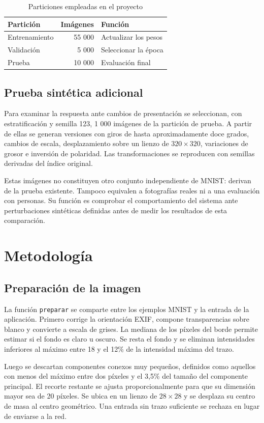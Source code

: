 \documentclass[conference]{IEEEtran}
\begin{document}
\begin{table}[t]
\caption{Particiones empleadas en el proyecto}
\label{tab:particiones}
\centering
\begin{tabular}{lrl}
\hline
Partición & Imágenes & Función \\
\hline
Entrenamiento & 55 000 & Actualizar los pesos \\
Validación & 5 000 & Seleccionar la época \\
Prueba & 10 000 & Evaluación final \\
\hline
\end{tabular}
\end{table}

\subsection{Prueba sintética adicional}
Para examinar la respuesta ante cambios de presentación se seleccionan, con estratificación y semilla 123, 1 000 imágenes de la partición de prueba. A partir de ellas se generan versiones con giros de hasta aproximadamente doce grados, cambios de escala, desplazamiento sobre un lienzo de $320\times320$, variaciones de grosor e inversión de polaridad. Las transformaciones se reproducen con semillas derivadas del índice original.

Estas imágenes no constituyen otro conjunto independiente de MNIST: derivan de la prueba existente. Tampoco equivalen a fotografías reales ni a una evaluación con personas. Su función es comprobar el comportamiento del sistema ante perturbaciones sintéticas definidas antes de medir los resultados de esta comparación.

\section{Metodología}
\subsection{Preparación de la imagen}
La función \texttt{preparar} se comparte entre los ejemplos MNIST y la entrada de la aplicación. Primero corrige la orientación EXIF, compone transparencias sobre blanco y convierte a escala de grises. La mediana de los píxeles del borde permite estimar si el fondo es claro u oscuro. Se resta el fondo y se eliminan intensidades inferiores al máximo entre 18 y el 12\% de la intensidad máxima del trazo.

Luego se descartan componentes conexos muy pequeños, definidos como aquellos con menos del máximo entre dos píxeles y el 3,5\% del tamaño del componente principal. El recorte restante se ajusta proporcionalmente para que su dimensión mayor sea de 20 píxeles. Se ubica en un lienzo de $28\times28$ y se desplaza su centro de masa al centro geométrico. Una entrada sin trazo suficiente se rechaza en lugar de enviarse a la red.
\end{document}

